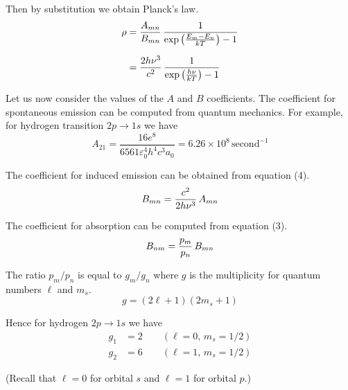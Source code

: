 \documentclass[12pt]{article}
\begin{document}
Then by substitution we obtain Planck's law.
\begin{align*}
\rho
&=\frac{A_{mn}}{B_{mn}}\,\frac{1}{\exp\left(\frac{E_m-E_n}{kT}\right)-1}
\\[1.5ex]
&=\frac{2h\nu^3}{c^2}\,\frac{1}{\exp\left(\frac{h\nu}{kT}\right)-1}
\end{align*}


Let us now consider the values of the $A$ and $B$ coefficients.
The coefficient for spontaneous emission can be computed from quantum mechanics.
For example, for hydrogen transition $2p\rightarrow1s$ we have
\begin{equation*}
A_{21}=\frac{16e^8}{6561\varepsilon_0^4h^4c^3a_0}
=6.26\times10^8\,\text{second}^{-1}
\end{equation*}

The coefficient for induced emission can be obtained from equation (4).
\begin{equation*}
B_{mn}=\frac{c^2}{2h\nu^3}\,A_{mn}
\end{equation*}

The coefficient for absorption can be computed from equation (3).
\begin{equation*}
B_{nm}=\frac{p_m}{p_n}\,B_{mn}
\end{equation*}

The ratio $p_m/p_n$ is equal to $g_m/g_n$ where $g$ is the multiplicity
for quantum numbers $\ell$ and $m_s$.
\begin{equation*}
g=(2\ell+1)(2m_s+1)
\end{equation*}

Hence for hydrogen $2p\rightarrow1s$ we have
\begin{align*}
g_1&=2\qquad(\ell=0,\,m_s=1/2)
\\
g_2&=6\qquad(\ell=1,\,m_s=1/2)
\end{align*}

(Recall that $\ell=0$ for orbital $s$ and $\ell=1$ for orbital $p$.)
\end{document}
